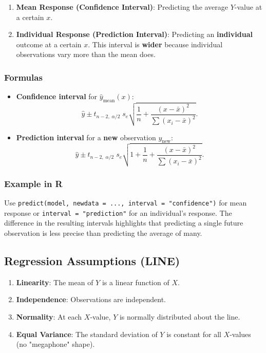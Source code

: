 \documentclass[10pt, total={6in, 8in}]{extarticle}
\begin{document}
\begin{enumerate}
    \item \textbf{Mean Response (Confidence Interval)}: Predicting the average $Y$-value at a certain $x$.
    \item \textbf{Individual Response (Prediction Interval)}: Predicting an \textbf{individual} outcome at a certain $x$. This interval is \textbf{wider} because individual observations vary more than the mean does.
\end{enumerate}

\subsubsection{Formulas}

\begin{itemize}
    \item \textbf{Confidence interval} for $\hat{y}_{\text{mean}}(x)$:
          \[
              \hat{y} \pm t_{n-2,\;\alpha/2}\; s_e\sqrt{\frac{1}{n} + \frac{(x - \bar{x})^2}{\sum (x_i - \bar{x})^2}}.
          \]
    \item \textbf{Prediction interval} for a \textbf{new} observation $y_{\text{new}}$:
          \[
              \hat{y} \pm t_{n-2,\;\alpha/2}\; s_e\sqrt{1 + \frac{1}{n} + \frac{(x - \bar{x})^2}{\sum (x_i - \bar{x})^2}}.
          \]
\end{itemize}

\subsubsection{Example in R}

Use \texttt{predict(model, newdata = ..., interval = "confidence")} for mean response or \texttt{interval = "prediction"} for an individual's response. The difference in the resulting intervals highlights that predicting a single future observation is less precise than predicting the average of many.



\subsection{Regression Assumptions (LINE)}

\begin{enumerate}
    \item \textbf{Linearity}: The mean of $Y$ is a linear function of $X$.
    \item \textbf{Independence}: Observations are independent.
    \item \textbf{Normality}: At each $X$-value, $Y$ is normally distributed about the line.
    \item \textbf{Equal Variance}: The standard deviation of $Y$ is constant for all $X$-values (no "megaphone" shape).
\end{enumerate}
\end{document}
